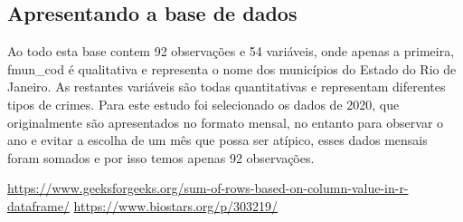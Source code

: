 \documentclass[
]{article}
\begin{document}
\hypertarget{apresentando-a-base-de-dados}{%
\subsection{Apresentando a base de
dados}\label{apresentando-a-base-de-dados}}

Ao todo esta base contem 92 observações e 54 variáveis, onde apenas a
primeira, fmun\_cod é qualitativa e representa o nome dos municípios do
Estado do Rio de Janeiro. As restantes variáveis são todas quantitativas
e representam diferentes tipos de crimes. Para este estudo foi
selecionado os dados de 2020, que originalmente são apresentados no
formato mensal, no entanto para observar o ano e evitar a escolha de um
mês que possa ser atípico, esses dados mensais foram somados e por isso
temos apenas 92 observações.

\url{https://www.geeksforgeeks.org/sum-of-rows-based-on-column-value-in-r-dataframe/}
\url{https://www.biostars.org/p/303219/}
\end{document}
